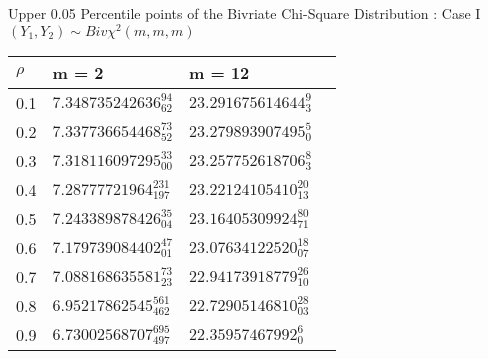 \documentclass{slides}
\begin{document}

\begin{slide}
\begin{center}
Upper 0.05 Percentile points of the Bivriate Chi-Square Distribution :
Case I \\
$(Y_1, Y_2) \sim Biv \chi^2(m,m,m)$
\end{center}
\renewcommand{\arraystretch}{1.5}
\begin{center}
\begin{tabular}{l|l|l|l}
$\rho$ & m = 2 & m = 12 \\ \hline
0.1  & $ 7.348735242636_{62}^{94} $ & $ 23.291675614644_3^9 $       \\
0.2  & $ 7.337736654468_{52}^{73} $ & $ 23.279893907495_0^5  $      \\
0.3  & $ 7.318116097295_{00}^{33} $ & $ 23.257752618706_3^8 $       \\
0.4  & $ 7.28777721964_{197}^{231} $ & $ 23.22124105410_{13}^{20}  $ \\
0.5  & $ 7.243389878426_{04}^{35} $ & $ 23.16405309924_{71}^{80}  $ \\
0.6  & $ 7.179739084402_{01}^{47} $ & $ 23.07634122520_{07}^{18}  $ \\
0.7  & $ 7.088168635581_{23}^{73} $ & $ 22.94173918779_{10}^{26}  $ \\
0.8  & $ 6.95217862545_{462}^{561} $ & $ 22.72905146810_{03}^{28}  $ \\
0.9  & $ 6.73002568707_{497}^{695} $ & $ 22.35957467992_0^6        $ \\
\end{tabular}
\end{center}

\end{slide}
\end{document}
